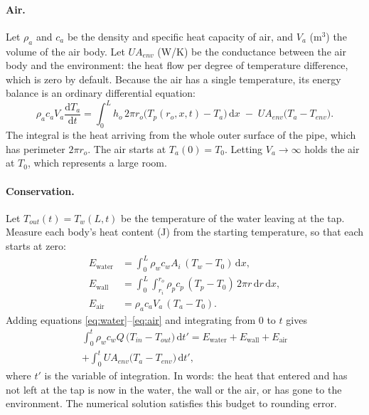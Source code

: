 \documentclass[a4paper,justified]{tufte-handout}
\newcommand{\dd}{\mathrm{d}}
\begin{document}
\paragraph{Air.} Let $\rho_a$ and $c_a$ be the density and specific heat
capacity of air, and $V_a$ (m$^3$) the volume of the air body. Let $UA_{env}$
(W/K) be the conductance between the air body and the environment: the heat
flow per degree of temperature difference, which is zero by default. Because
the air has a single temperature, its energy balance is an ordinary
differential equation:
\begin{equation}
  \rho_a c_a V_a \frac{\dd T_a}{\dd t}
  = \int_0^L h_o\,2\pi r_o\bigl(T_p(r_o,x,t)-T_a\bigr)\,\dd x \;-\; UA_{env}\bigl(T_a-T_{env}\bigr).
  \label{eq:air}
\end{equation}
The integral is the heat arriving from the whole outer surface of the pipe,
which has perimeter $2\pi r_o$. The air starts at $T_a(0)=T_0$. Letting
$V_a\to\infty$ holds the air at $T_0$, which represents a large
room.

\paragraph{Conservation.} Let $T_{out}(t)=T_w(L,t)$ be the temperature of the
water leaving at the tap. Measure each body's heat content (J) from the starting
temperature, so that each starts at zero:
\begin{align*}
  E_{\text{water}} &= \int_0^L\rho_w c_w A_i\,(T_w-T_0)\,\dd x,\\
  E_{\text{wall}}  &= \int_0^L\!\!\int_{r_i}^{r_o}\rho_p c_p\,(T_p-T_0)\,2\pi r\,\dd r\,\dd x,\\
  E_{\text{air}}   &= \rho_a c_a V_a\,(T_a-T_0).
\end{align*} Adding equations
\eqref{eq:water}--\eqref{eq:air} and integrating from $0$ to $t$ gives
\begin{multline}
  \int_0^t \rho_w c_w Q\,\bigl(T_{in}-T_{out}\bigr)\,\dd t'
  = E_{\text{water}}+E_{\text{wall}}+E_{\text{air}} \\
  + \int_0^t UA_{env}\bigl(T_a-T_{env}\bigr)\,\dd t' ,
\end{multline}
where $t'$ is the variable of integration. In words: the heat that entered and
has not left at the tap is now in the water, the wall or the air, or has gone
to the environment. The numerical solution satisfies this budget to rounding
error.
\end{document}
